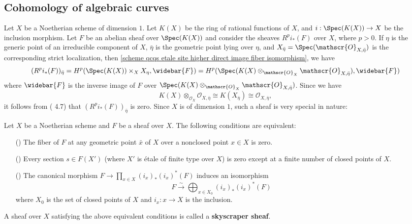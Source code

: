 \subsection{Cohomology of algebraic curves}
Let $X$ be a Noetherian scheme of dimension $1$. Let $K(X)$ be the ring of rational functions of $X$, and $i:\Spec(K(X))\to X$ be the inclusion morphism. Let $F$ be an abelian sheaf over $\Spec(K(X))$ and consider the sheaves $R^pi_*(F)$ over $X$, where $p>0$. If $\eta$ is the generic point of an irreducible component of $X$, $\bar{\eta}$ is the geometric point lying over $\eta$, and $X_{\bar{\eta}}=\Spec(\mathscr{O}_{X,\bar{\eta}})$ is the corresponding strict localization, then \cref{scheme qcqs etale site higher direct image fiber isomorphism}, we have
\[(R^pi_*(F))_{\bar{\eta}}=H^p(\Spec(K(X))\times_XX_\eta,\widebar{F})=H^p(\Spec(K(X)\otimes_{\mathscr{O}_X}\mathscr{O}_{X,\bar{\eta}}),\widebar{F})\]
where $\widebar{F}$ is the inverse image of $F$ over $\Spec(K(X)\otimes_{\mathscr{O}_X}\mathscr{O}_{X,\bar{\eta}})$. Since we have
\[K(X)\otimes_{\mathscr{O}_X}\mathscr{O}_{X,\bar{\eta}}\cong K(X_{\bar{\eta}})\cong \mathscr{O}_{X,\bar{\eta}},\]
it follows from (\cite{SGA4-2}  4.7) that $(R^pi_*(F))_{\bar{\eta}}$ is zero. Since $X$ is of dimension $1$, such a sheaf is very special in nature:
\begin{lemma}\label{scheme Noe skyscraper sheaf char}
Let $X$ be a Noetherian scheme and $F$ be a sheaf over $X$. The following conditions are equivalent:
\begin{enumerate}
    \item[(\rmnum{1})] The fiber of $F$ at any geometric point $\bar{x}$ of $X$ over a nonclosed point $x\in X$ is zero.
    \item[(\rmnum{2})] Every section $s\in F(X')$ (where $X'$ is \'etale of finite type over $X$) is zero except at a finite number of closed points of $X$.
    \item[(\rmnum{3})] The canonical morphism $F\to\prod_{x\in X}(i_x)_*(i_x)^*(F)$ induces an isomorphism
    \[F \stackrel{\sim}{\to} \bigoplus_{x\in X_0}(i_x)_*(i_x)^*(F)\]
    where $X_0$ is the set of closed points of $X$ and $i_x:x\to X$ is the inclusion.
\end{enumerate}
A sheaf over $X$ satisfying the above equivalent conditions is called a \textbf{skyscraper sheaf}.
\end{lemma}
